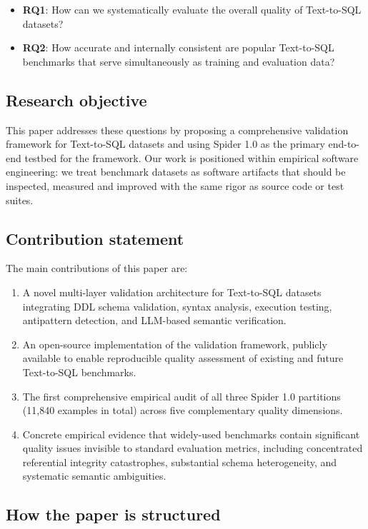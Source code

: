 \documentclass[print]{einformatica}
\begin{document}
\begin{itemize}
\item \textbf{RQ1}: How can we systematically evaluate the overall quality of Text-to-SQL datasets?
\item \textbf{RQ2}: How accurate and internally consistent are popular Text-to-SQL benchmarks that serve simultaneously as training and evaluation data?
\end{itemize}

\subsection*{Research objective}

This paper addresses these questions by proposing a comprehensive validation framework for Text-to-SQL datasets and using Spider 1.0 as the primary end-to-end testbed for the framework. Our work is positioned within empirical software engineering: we treat benchmark datasets as software artifacts that should be inspected, measured and improved with the same rigor as source code or test suites.

\subsection*{Contribution statement}

The main contributions of this paper are:

\begin{enumerate}
\item A novel multi-layer validation architecture for Text-to-SQL datasets integrating DDL schema validation, syntax analysis, execution testing, antipattern detection, and LLM-based semantic verification.
\item An open-source implementation of the validation framework, publicly available to enable reproducible quality assessment of existing and future Text-to-SQL benchmarks.
\item The first comprehensive empirical audit of all three Spider 1.0 partitions (11,840 examples in total) across five complementary quality dimensions.
\item Concrete empirical evidence that widely-used benchmarks contain significant quality issues invisible to standard evaluation metrics, including concentrated referential integrity catastrophes, substantial schema heterogeneity, and systematic semantic ambiguities.
\end{enumerate}

\subsection*{How the paper is structured}
\end{document}
